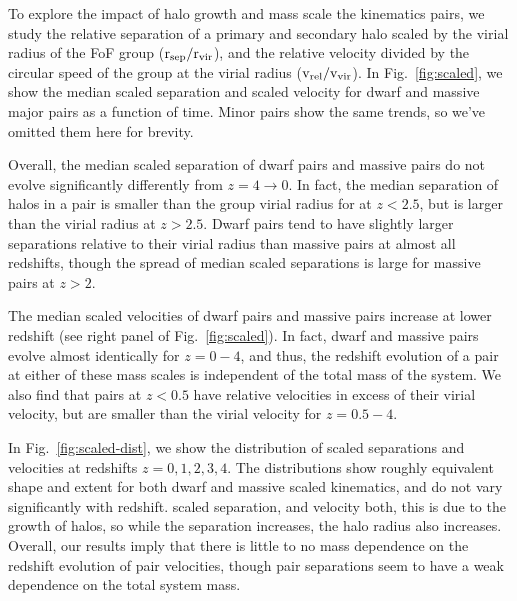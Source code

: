 \documentclass[twocolumn]{aastex631}
\newcommand{\scsep}{\ensuremath{\rm r_{sep}/r_{vir}}}
\newcommand{\scvel}{\ensuremath{\rm v_{rel}/v_{vir}}}
\begin{document}
To explore the impact of halo growth and mass scale the kinematics pairs, we study the relative separation of a primary and secondary halo scaled by the virial radius of the FoF group (\scsep), and the relative velocity divided by the circular speed of the group at the virial radius (\scvel).     
In Fig.~\ref{fig:scaled}, we show the median scaled separation and scaled velocity for dwarf and massive major pairs as a function of time. 
Minor pairs show the same trends, so we've omitted them here for brevity.

Overall, the median scaled separation of dwarf pairs and massive pairs do not evolve significantly differently from $z=4\to0$.
In fact, the median separation of halos in a pair is smaller than the group virial radius for at $z<2.5$, but is larger than the virial radius at $z>2.5$.
Dwarf pairs tend to have slightly larger separations relative to their virial radius than massive pairs at almost all redshifts, though the spread of median scaled separations is large for massive pairs at $z>2$. 

The median scaled velocities of dwarf pairs and massive pairs increase at lower redshift (see right panel of Fig.~\ref{fig:scaled}). In fact, dwarf and massive pairs evolve almost identically for $z=0-4$, and thus, the redshift evolution of a pair at either of these mass scales is independent of the total mass of the system. 
We also find that pairs at $z<0.5$ have relative velocities in excess of their virial velocity, but are smaller than the virial velocity for $z=0.5-4$.
 
In Fig.~\ref{fig:scaled-dist}, we show the distribution of scaled separations and velocities at redshifts $z=0,1,2,3,4$. 
The distributions show roughly equivalent shape and extent for both dwarf and massive scaled kinematics, and do not vary significantly with redshift. 
scaled separation, and velocity both, this is due to the growth of halos, so while the separation increases, the halo radius also increases.
Overall, our results imply that there is little to no mass dependence on the redshift evolution of pair velocities, though pair separations seem to have a weak dependence on the total system mass. 
\end{document}
